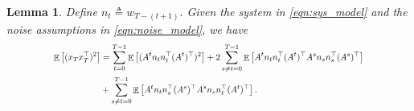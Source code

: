 \documentclass[letterpaper, 11 pt]{article}
\DeclareMathOperator{\E}{\mathbb{E}}
\newtheorem{lemma}{Lemma}
\begin{document}
\begin{lemma} Define $n_t \triangleq w_{T-(t+1)}.$ Given the system in \eqref{eqn:sys_model} and the noise assumptions in \eqref{eqn:noise_model}, we have
    \begin{equation}
    \resizebox{0.8\hsize}{!}{$
    \begin{aligned}
\E\left[(x_Tx_T^{\top})^2\right] &= \sum_{t=0}^{T-1} \E\left[(A^tn_tn_t^{\top}(A^t)^{\top})^2\right] 
         + 2\sum_{s\neq t=0}^{T-1} \E\left[ A^tn_tn_t^{\top}(A^t)^{\top} A^sn_sn_s^{\top}(A^s)^{\top}\right]\\ 
         &+ \sum_{s\neq t=0}^{T-1} \E\left[ A^tn_tn_s^{\top}(A^s)^{\top} A^sn_sn_t^{\top}(A^t)^{\top}\right]. 
         \nonumber 
\end{aligned}$}
    \end{equation}
\end{lemma}
\end{document}
